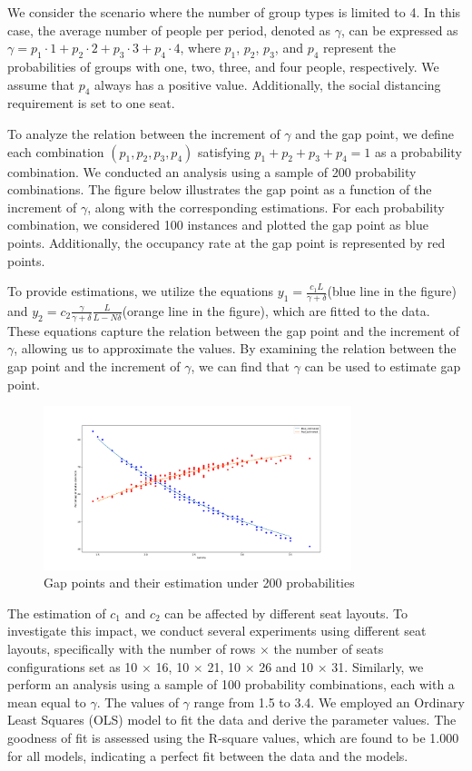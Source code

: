 We consider the scenario where the number of group types is limited to 4. In this case, the average number of people per period, denoted as $\gamma$, can be expressed as $\gamma = p_1 \cdot 1 + p_2 \cdot 2 + p_3 \cdot 3 + p_4 \cdot 4$, where $p_1$, $p_2$, $p_3$, and $p_4$ represent the probabilities of groups with one, two, three, and four people, respectively. We assume that $p_4$ always has a positive value. Additionally, the social distancing requirement is set to one seat.

To analyze the relation between the increment of $\gamma$ and the gap point, we define each combination $(p_1, p_2, p_3, p_4)$ satisfying $p_1 + p_2 + p_3 + p_4 = 1$ as a probability combination. We conducted an analysis using a sample of 200 probability combinations. The figure below illustrates the gap point as a function of the increment of $\gamma$, along with the corresponding estimations. For each probability combination, we considered 100 instances and plotted the gap point as blue points. Additionally, the occupancy rate at the gap point is represented by red points.

To provide estimations, we utilize the equations $y_1 = \frac{c_1 L}{\gamma + \delta}$(blue line in the figure) and $y_2 = c_2 \frac{\gamma}{\gamma + \delta} \frac{L}{L-N \delta}$(orange line in the figure), which are fitted to the data. These equations capture the relation between the gap point and the increment of $\gamma$, allowing us to approximate the values. By examining the relation between the gap point and the increment of $\gamma$, we can find that $\gamma$ can be used to estimate gap point.

\begin{figure}[ht]
  \centering
    \includegraphics[width=0.8\textwidth]{./Figures/re2.pdf}
  \caption{Gap points and their estimation under 200 probabilities}
\end{figure}

The estimation of $c_1$ and $c_2$ can be affected by different seat layouts. To investigate this impact, we conduct several experiments using different seat layouts, specifically with the number of rows $\times$ the number of seats configurations set as 10 $\times$ 16, 10 $\times$ 21, 10 $\times$ 26 and 10 $\times$ 31. Similarly, we perform an analysis using a sample of 100 probability combinations, each with a mean equal to $\gamma$. The values of $\gamma$ range from 1.5 to 3.4. We employed an Ordinary Least Squares (OLS) model to fit the data and derive the parameter values. The goodness of fit is assessed using the R-square values, which are found to be 1.000 for all models, indicating a perfect fit between the data and the models.

